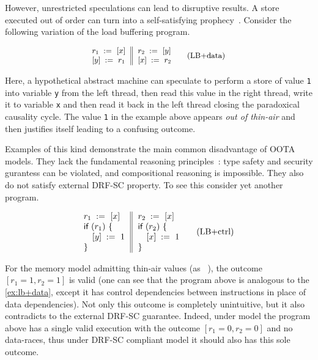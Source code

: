 However, unrestricted speculations can lead to disruptive results. 
A store executed out of order can turn into 
a self-satisfying prophecy~\cite{Boehm-Demsky:MSPC14}.
Consider the following variation of the load buffering program. 

\begin{equation*}
\small
\inarrII{
  \readInst{}{r_1}{x}   \\
  \writeInst{}{y}{r_1}  \\
}{
  \readInst{}{r_2}{y}   \\
  \writeInst{}{x}{r_2}  \\
}
\tag{LB+data}\label{ex:lb+data}
\end{equation*}

Here, a hypothetical abstract machine can speculate 
to perform a store of value \texttt{1} into variable \texttt{y}
from the left thread, then read this value in the right thread, 
write it to variable \texttt{x} and then read it back in the
left thread closing the paradoxical causality cycle.
The value \texttt{1} in the example above appears \emph{out of thin-air}
and then justifies itself leading to a confusing outcome.
 
Examples of this kind demonstrate the main common 
disadvantage of OOTA models.
They lack the fundamental reasoning 
principles~\cite{Boehm-Demsky:MSPC14, Batty-al:ESOP15}:
type safety and security gurantess can be violated, 
and compositional reasoning is impossible.
They also do not satisfy external DRF-SC property.
To see this consider yet another program.

\begin{equation*}
\inarrII{
  \readInst{}{r_1}{x}      \\
  \kw{if} {(r_1)} ~\{      \\
  \quad\writeInst{}{y}{1}  \\
  \}
}{
  \readInst{}{r_2}{x}      \\
  \kw{if} {(r_2)} ~\{      \\
  \quad\writeInst{}{x}{1}  \\
  \}
}
\tag{LB+ctrl}\label{ex:lb+ctrl}
\end{equation*}

For the memory model admitting thin-air values 
(as \eg \CMM~\cite{Batty-al:POPL11}), 
the outcome $[r_1=1, r_2=1]$ is valid
(one can see that the program above is analogous 
to the \ref{ex:lb+data}, except it has 
control dependencies between instructions 
in place of data dependencies).
Not only this outcome is completely unintuitive,
but it also contradicts to the external DRF-SC guarantee.
Indeed, under \SC model the program above has 
a single valid execution with the outcome $[r_1=0, r_2=0]$ 
and no data-races, thus under DRF-SC compliant model 
it should also has this sole outcome.  

